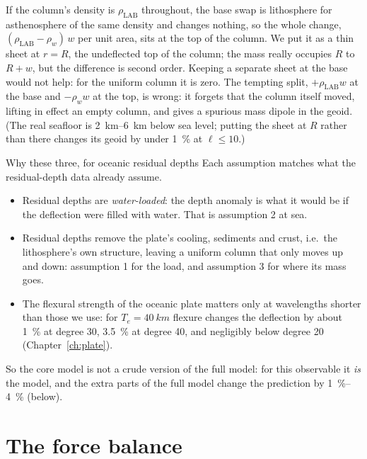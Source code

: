 \begin{enumerate}[nosep]
If the column's density is $\rho_{\mathrm{LAB}}$ throughout, the base swap is lithosphere for asthenosphere of the same density and changes nothing, so the whole change, $(\rho_{\mathrm{LAB}}-\rho_w)\,w$ per unit area, sits at the top of the column.
We put it as a thin sheet at $r=R$, the undeflected top of the column; the mass really occupies $R$ to $R+w$, but the difference is second order.
Keeping a separate sheet at the base would not help: for the uniform column it is zero. The tempting split, $+\rho_{\mathrm{LAB}}w$ at the base and $-\rho_w w$ at the top, is wrong: it forgets that the column itself moved, lifting in effect an empty column, and gives a spurious mass dipole in the geoid.
(The real seafloor is \qtyrange{2}{6}{km} below sea level; putting the sheet at $R$ rather than there changes its geoid by under \qty{1}{\percent} at $\ell\le10$.)
\end{enumerate}

\begin{decision}{Why these three, for oceanic residual depths}
Each assumption matches what the residual-depth data already assume.
\begin{itemize}[nosep]
\item Residual depths are \emph{water-loaded}: the depth anomaly is what it would be if the deflection were filled with water.
That is assumption 2 at sea.
\item Residual depths remove the plate's cooling, sediments and crust, i.e.\ the lithosphere's own structure, leaving a uniform column that only moves up and down: assumption 1 for the load, and assumption 3 for where its mass goes.
\item The flexural strength of the oceanic plate matters only at wavelengths shorter than those we use: for $T_e=\qty{40}{km}$ flexure changes the deflection by about \qty{1}{\percent} at degree 30, \qty{3.5}{\percent} at degree 40, and negligibly below degree 20 (Chapter~\ref{ch:plate}).
\end{itemize}
So the core model is not a crude version of the full model: for this observable it \emph{is} the model, and the extra parts of the full model change the prediction by \qtyrange{1}{4}{\percent} (below).
\end{decision}

\section{The force balance}


